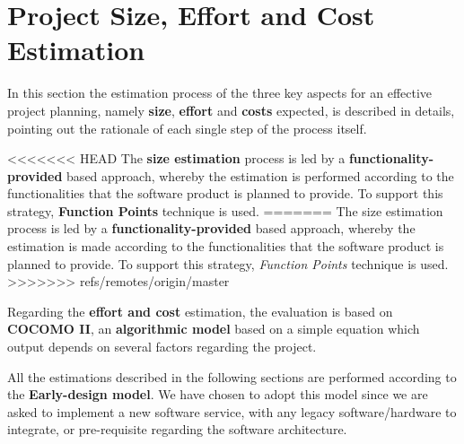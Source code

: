 \section{Project Size, Effort and Cost Estimation}
\label{sec:SizeEffortCost}

In this section the estimation process of the three key aspects for an effective project planning, namely \textbf{size}, \textbf{effort} and \textbf{costs} expected, is described in details, pointing out the rationale of each single step of the process itself.

<<<<<<< HEAD
The \textbf{size estimation} process is led by a \textbf{functionality-provided} based approach, whereby the estimation is performed according to the functionalities that the software product is planned to provide. To support this strategy, \textbf{Function Points} technique is used. 
=======
The size estimation process is led by a \textbf{functionality-provided} based approach, whereby the estimation is made according to the functionalities that the software product is planned to provide. To support this strategy, \textit{Function Points} technique is used.
>>>>>>> refs/remotes/origin/master

Regarding the \textbf{effort and cost} estimation, the evaluation is based on \textbf{COCOMO II}, an \textbf{algorithmic model} based on a simple equation which output depends on several factors regarding the project.

All the estimations described in the following sections are performed according to the \textbf{Early-design model}. We have chosen to adopt this model since we are asked to implement a new software service, with any legacy software/hardware to integrate, or pre-requisite regarding the software architecture.

	
	
